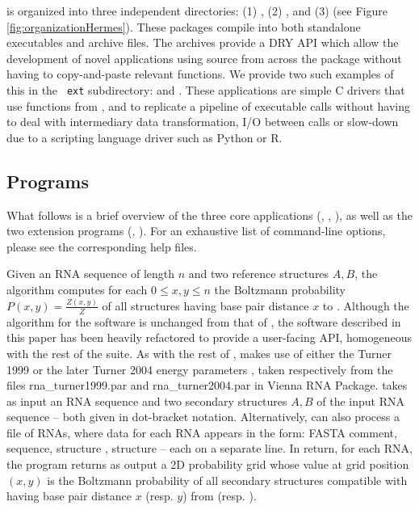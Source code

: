 \hermes is organized into three independent directories: (1)
\ffttwo, (2) \rnamfpt, and (3) \rnaeq (see
Figure \ref{fig:organizationHermes}). These packages compile into both
standalone executables and archive files. The archives provide a DRY
API which allow the development of novel applications using source
from across the \hermes package without having to copy-and-paste
relevant functions. We provide two such examples of this in the {\tt
ext} subdirectory: \fftmfpt and \ffteq. These applications
are simple C drivers that use functions from \ffttwo, \rnamfpt and
\rnaeq to replicate a pipeline of executable calls without having to
deal with intermediary data transformation, I/O between calls or
slow-down due to a scripting language driver such as Python or R.

\subsection{Programs}

What follows is a brief overview of the three core applications
(\ffttwo, \rnamfpt, \rnaeq), as well as the two extension
programs (\fftmfpt, \ffteq). For an exhaustive list of
command-line options, please see the corresponding help files.

Given an RNA sequence \seq of length $n$ and two reference
structures $A,B$, the algorithm \ffttwo \citep{Senter.jmb14}
computes for each $0 \leq x,y \leq n$ the Boltzmann probability
$P(x,y) = \frac{Z(x,y)}{Z}$ of all structures having base pair
distance $x$ to . Although the algorithm for the
software \ffttwo is unchanged from that of \citep{Senter.jmb14},
the software described in this
paper has been heavily refactored to provide a user-facing API,
homogeneous with the rest of the \hermes suite. As with the rest of
\hermes, \ffttwo makes use of either the Turner 1999 \citep{turner}
or the later Turner 2004 energy parameters
\citep{Turner.nar10}, taken respectively
from the files rna\_turner1999.par and  rna\_turner2004.par in Vienna
RNA Package. \ffttwo takes as input an RNA sequence \seq and two
secondary structures $A,B$ of the input RNA sequence -- both given
in dot-bracket
notation. Alternatively, \ffttwo can also process a file of RNAs,
where data for each RNA appears in the form: FASTA comment, sequence,
structure \strA, structure \strB -- each on a separate line. In return,
for each RNA, the program returns as output a 2D probability grid
whose value at
grid position $(x,y)$ is the Boltzmann probability of all secondary
structures compatible with \seq having base pair distance $x$ (resp.
$y$) from \strA (resp. \strB).


